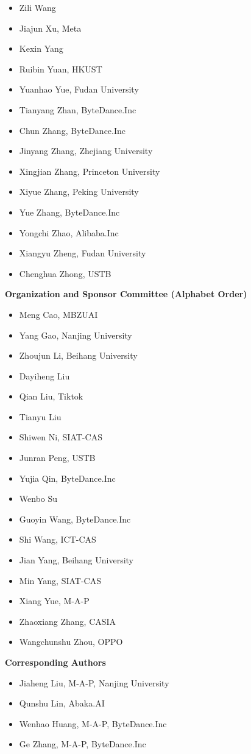 \begin{multicols}{2}
\begin{itemize}
        \item Zili Wang
        \item Jiajun Xu, Meta
        \item Kexin Yang
        \item Ruibin Yuan, HKUST
        \item Yuanhao Yue, Fudan University
        \item Tianyang Zhan, ByteDance.Inc
        \item Chun Zhang, ByteDance.Inc
        \item Jinyang Zhang, Zhejiang University
        \item Xingjian Zhang, Princeton University
        \item Xiyue Zhang, Peking University
        \item Yue Zhang, ByteDance.Inc
        \item Yongchi Zhao, Alibaba.Inc
        \item Xiangyu Zheng, Fudan University
        \item Chenghua Zhong, USTB
    \end{itemize}
\end{multicols}

\textbf{Organization and Sponsor Committee (Alphabet Order)}
\begin{multicols}{2}
    \begin{itemize}
        \item Meng Cao, MBZUAI
        \item Yang Gao, Nanjing University
        \item Zhoujun Li, Beihang University
        \item Dayiheng Liu
        \item Qian Liu, Tiktok
        \item Tianyu Liu        
        \item Shiwen Ni, SIAT-CAS
        \item Junran Peng, USTB
        \item Yujia Qin, ByteDance.Inc
        \item Wenbo Su
        \item Guoyin Wang, ByteDance.Inc
        \item Shi Wang, ICT-CAS
        \item Jian Yang, Beihang University
        \item Min Yang, SIAT-CAS
        \item Xiang Yue, M-A-P
        \item Zhaoxiang Zhang, CASIA
        \item Wangchunshu Zhou, OPPO
    \end{itemize}
\end{multicols}

\textbf{Corresponding Authors}
\begin{multicols}{2}
    \begin{itemize}
        \item Jiaheng Liu, M-A-P, Nanjing University
        \item Qunshu Lin, Abaka.AI
        \item Wenhao Huang, M-A-P, ByteDance.Inc
        \item Ge Zhang, M-A-P, ByteDance.Inc
    \end{itemize}
\end{multicols}